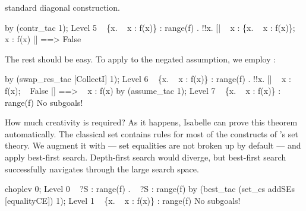 standard diagonal construction.
\begin{ttbox}
by (contr_tac 1);
{\out Level 5}
{\out ~ \{x. ~ x : f(x)\} : range(f)}
{. !!x. [| ~ x : \{x. ~ x : f(x)\}; ~ x : f(x) |] ==> False}
\end{ttbox}
The rest should be easy.  To apply  to the negated
assumption, we employ :
\begin{ttbox}
by (swap_res_tac [CollectI] 1);
{\out Level 6}
{\out ~ \{x. ~ x : f(x)\} : range(f)}
{. !!x. [| ~ x : f(x); ~ False |] ==> ~ x : f(x)}
\ttbreak
by (assume_tac 1);
{\out Level 7}
{\out ~ \{x. ~ x : f(x)\} : range(f)}
{\out No subgoals!}
\end{ttbox}
How much creativity is required?  As it happens, Isabelle can prove this
theorem automatically.  The classical set  contains rules
for most of the constructs of \HOL's set theory.  We augment it with
 --- set equalities are not broken up by default ---
and apply best-first search.  Depth-first search would diverge, but
best-first search successfully navigates through the large search space.
\begin{ttbox}
choplev 0;
{\out Level 0}
{\out ~ ?S : range(f)}
{. ~ ?S : range(f)}
\ttbreak
by (best_tac (set_cs addSEs [equalityCE]) 1);
{\out Level 1}
{\out ~ \{x. ~ x : f(x)\} : range(f)}
{\out No subgoals!}
\end{ttbox}
